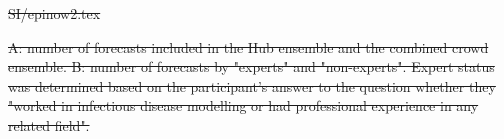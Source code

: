 \documentclass[10pt,a4paper,twocolumn]{article}
\providecommand{\DIFdeltex}[1]{{\protect\color{red}\sout{#1}}}                      %
\providecommand{\DIFdelbegin}{} %
\providecommand{\DIFdelend}{} %
\providecommand{\DIFdelFL}[1]{\DIFdel{#1}} %
\providecommand{\DIFdel}[1]{\texorpdfstring{\DIFdeltex{#1}}{}} %
\begin{document}
\DIFdelbegin %
\DIFdel{SI/epinow2.tex
}\DIFdelend %


\DIFdelbegin %
{%
\DIFdelFL{A: number of forecasts included in the Hub ensemble and the combined crowd ensemble. B: number of forecasts by "experts" and "non-experts". Expert status was determined based on the participant's answer to the question whether they "worked in infectious disease modelling or had professional experience in any related field".}}
\DIFdelend %
\end{document}
